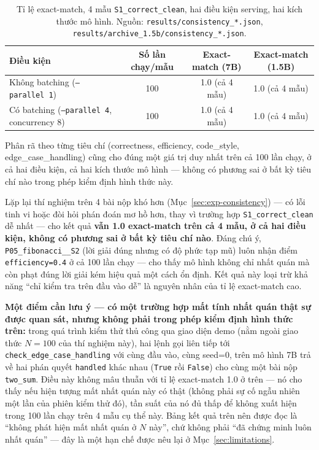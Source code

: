 \documentclass[a4paper,12pt]{report}
\begin{document}
\begin{table}[h]
\centering
\begin{tabular}{lccc}
\toprule
\textbf{Điều kiện} & \textbf{Số lần chạy/mẫu} & \textbf{Exact-match (7B)} & \textbf{Exact-match (1.5B)} \\
\midrule
Không batching (\texttt{--parallel 1}) & 100 & 1.0 (cả 4 mẫu) & 1.0 (cả 4 mẫu) \\
Có batching (\texttt{--parallel 4}, concurrency 8) & 100 & 1.0 (cả 4 mẫu) & 1.0 (cả 4 mẫu) \\
\bottomrule
\end{tabular}
\caption{Tỉ lệ exact-match, 4 mẫu \texttt{S1\_correct\_clean}, hai điều
kiện serving, hai kích thước mô hình. Nguồn: \texttt{results/consistency\_*.json},
\texttt{results/archive\_1.5b/consistency\_*.json}.}
\end{table}

Phân rã theo từng tiêu chí (correctness, efficiency, code\_style,
edge\_case\_handling) cũng cho đúng một giá trị duy nhất trên cả 100 lần
chạy, ở cả hai điều kiện, cả hai kích thước mô hình — không có phương sai ở
bất kỳ tiêu chí nào trong phép kiểm định hình thức này.

Lặp lại thí nghiệm trên 4 bài nộp khó hơn (Mục~\ref{sec:exp-consistency}) —
có lỗi tinh vi hoặc đòi hỏi phán đoán mơ hồ hơn, thay vì trường hợp
\texttt{S1\_correct\_clean} dễ nhất — cho kết quả \textbf{vẫn 1.0
exact-match trên cả 4 mẫu, ở cả hai điều kiện, không có phương sai ở bất kỳ
tiêu chí nào}. Đáng chú ý, \texttt{P05\_fibonacci\_\_S2} (lời giải đúng
nhưng có độ phức tạp mũ) luôn nhận điểm \texttt{efficiency=0.4} ở cả 100
lần chạy — cho thấy mô hình không chỉ nhất quán mà còn phạt đúng lời giải
kém hiệu quả một cách ổn định. Kết quả này loại trừ khả năng ``chỉ kiểm tra
trên đầu vào dễ'' là nguyên nhân của tỉ lệ exact-match cao.

\textbf{Một điểm cần lưu ý — có một trường hợp mất tính nhất quán thật sự
được quan sát, nhưng không phải trong phép kiểm định hình thức trên:}
trong quá trình kiểm thử thủ công qua giao diện demo (nằm ngoài giao thức
$N=100$ của thí nghiệm này), hai lệnh gọi liên tiếp tới
\texttt{check\_edge\_case\_handling} với cùng đầu vào, cùng seed=0, trên mô
hình 7B trả về hai phán quyết \texttt{handled} khác nhau (\texttt{True} rồi
\texttt{False}) cho cùng một bài nộp \texttt{two\_sum}. Điều này không mâu
thuẫn với tỉ lệ exact-match 1.0 ở trên — nó cho thấy nếu hiện tượng mất
nhất quán này có thật (không phải sự cố ngẫu nhiên một lần của phiên kiểm
thử đó), tần suất của nó đủ thấp để không xuất hiện trong 100 lần chạy trên
4 mẫu cụ thể này. Bảng kết quả trên nên được đọc là ``không phát hiện mất
nhất quán ở $N$ này'', chứ không phải ``đã chứng minh luôn nhất quán'' —
đây là một hạn chế được nêu lại ở Mục~\ref{sec:limitations}.
\end{document}
